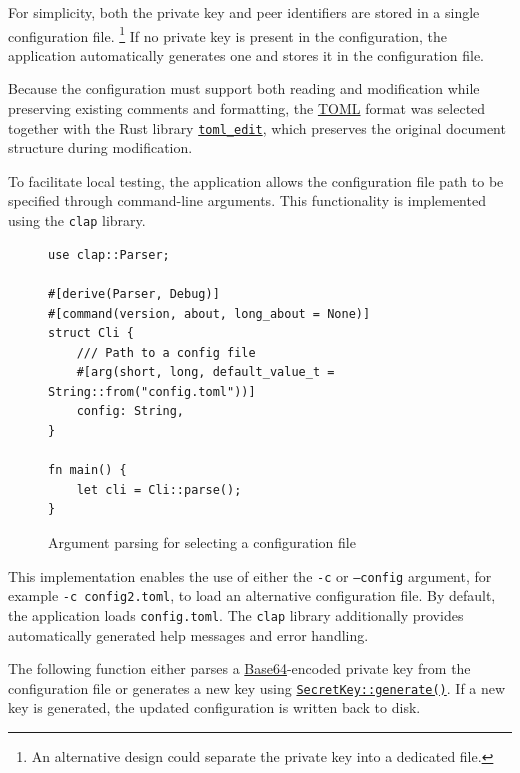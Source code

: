 \documentclass[a4paper, 10pt]{article}
\begin{document}
For simplicity, both the private key and peer identifiers are stored in a single configuration file.
\footnote{An alternative design could separate the private key into a dedicated file.}
If no private key is present in the configuration, the application automatically generates one and stores it in the configuration file.

Because the configuration must support both reading and modification while preserving existing comments and formatting, the
\href{https://toml.io/en/}{TOML}
format was selected together with the Rust library
\href{https://crates.io/crates/toml_edit}{\texttt{toml\_edit}},
which preserves the original document structure during modification.

To facilitate local testing, the application allows the configuration file path to be specified through
command-line arguments. This functionality is implemented using the \texttt{clap} library.

\begin{figure}[H]
  \begin{verbatim}
use clap::Parser;

#[derive(Parser, Debug)]
#[command(version, about, long_about = None)]
struct Cli {
    /// Path to a config file
    #[arg(short, long, default_value_t = String::from("config.toml"))]
    config: String,
}

fn main() {
    let cli = Cli::parse();
}
  \end{verbatim}
  \caption{Argument parsing for selecting a configuration file}
\end{figure}

This implementation enables the use of either the \texttt{-c} or \texttt{--config} argument, for example \texttt{-c config2.toml},
to load an alternative configuration file. By default, the application loads \texttt{config.toml}.
The \texttt{clap} library additionally provides automatically generated help messages and error handling.

\newpage

The following function either parses a
\href{https://en.wikipedia.org/wiki/Base64}{Base64}-encoded private key
from the configuration file or generates a new key using
\href{https://docs.rs/iroh/latest/iroh/struct.SecretKey.html#method.generate}{\texttt{SecretKey::generate()}}.
If a new key is generated, the updated configuration is written back to disk.
\end{document}
